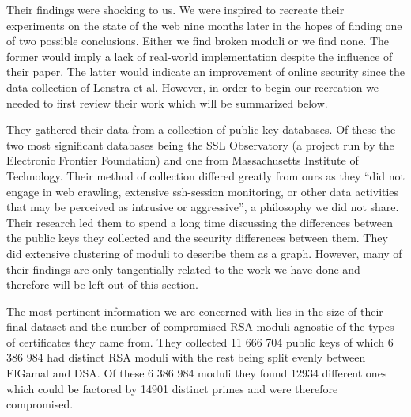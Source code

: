 \documentclass[11pt,twoside]{article}
\begin{document}
\begin{multicols}{2}
Their findings were shocking to us. We were inspired to recreate their
experiments on the state of the web nine months later in the hopes of finding
one of two possible conclusions. Either we find broken moduli or we find none.
The former would imply a lack of real-world implementation despite the influence
of their paper. The latter would indicate an improvement of online security
since the data collection of Lenstra et al. However, in order to begin our
recreation we needed to first review their work which will be summarized below.

They gathered their data from a collection of public-key databases. Of these the
two most significant databases being the SSL Observatory (a project run by the
Electronic Frontier Foundation) and one  from Massachusetts Institute of
Technology. Their method of collection differed greatly from ours as they “did
not engage in web crawling, extensive ssh-session monitoring, or other data
activities that may be perceived as intrusive or aggressive”, a philosophy we
did not share. Their research led them to spend a long time discussing the
differences between the public keys they collected and the security differences
between them. They did extensive clustering of moduli to describe them as a
graph. However, many of their findings are only tangentially related to the work
we have done and therefore will be left out of this section.

The most pertinent information we are concerned with lies in the size of their
final dataset and the number of compromised RSA moduli agnostic of the types of
certificates they came from. They collected 11 666 704 public keys of which 6
386 984 had distinct RSA moduli with the rest being split evenly between ElGamal
and DSA. Of these 6 386 984 moduli they found 12934 different ones which could
be factored by 14901 distinct primes and were therefore compromised.



\end{multicols}
\end{document}
